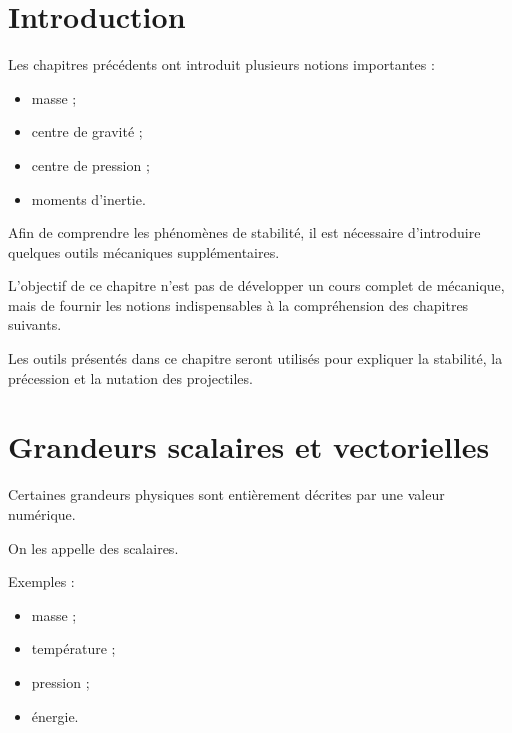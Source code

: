 
\section{Introduction}

Les chapitres précédents ont introduit plusieurs notions importantes :

\begin{itemize}
    \item masse ;
    \item centre de gravité ;
    \item centre de pression ;
    \item moments d'inertie.
\end{itemize}

Afin de comprendre les phénomènes de stabilité, il est nécessaire
d'introduire quelques outils mécaniques supplémentaires.

L'objectif de ce chapitre n'est pas de développer un cours complet de
mécanique, mais de fournir les notions indispensables à la compréhension des
chapitres suivants.

\begin{aretenir}

Les outils présentés dans ce chapitre seront utilisés pour expliquer la
stabilité, la précession et la nutation des projectiles.

\end{aretenir}

\section{Grandeurs scalaires et vectorielles}

Certaines grandeurs physiques sont entièrement décrites par une valeur
numérique.

On les appelle des scalaires.

Exemples :

\begin{itemize}
    \item masse ;
    \item température ;
    \item pression ;
    \item énergie.
\end{itemize}


